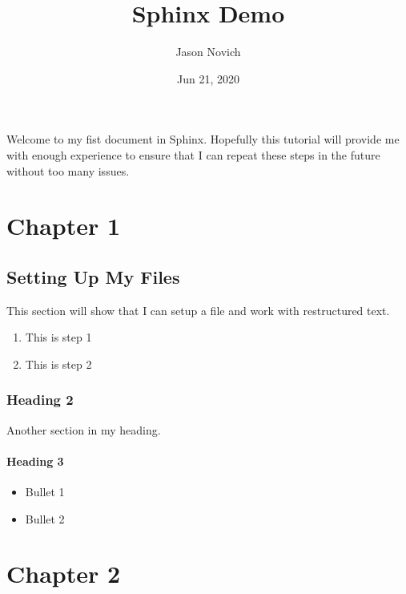 \documentclass[letterpaper,10pt,english]{sphinxmanual}
\title{Sphinx Demo}
\date{Jun 21, 2020}
\author{Jason Novich}
\begin{document}
\pagestyle{empty}
\sphinxmaketitle
\pagestyle{plain}
\sphinxtableofcontents
\pagestyle{normal}
\label{\detokenize{index::doc}}


Welcome to my fist document in Sphinx. Hopefully this tutorial will provide me with enough experience
to ensure that I can repeat these steps in the future without too many issues.


\chapter{Chapter 1}
\label{\detokenize{Chapter1:chapter-1}}\label{\detokenize{Chapter1:chapter1}}\label{\detokenize{Chapter1::doc}}

\section{Setting Up My Files}
\label{\detokenize{Chapter1:setting-up-my-files}}
This section will show that I can setup a file and work with restructured text.
\begin{enumerate}
%
\item {} 
This is step 1

\item {} 
This is step 2

\end{enumerate}


\subsection{Heading 2}
\label{\detokenize{Chapter1:heading-2}}
Another section in my heading.




\subsubsection{Heading 3}
\label{\detokenize{Chapter1:heading-3}}\begin{itemize}
\item {} 
Bullet 1

\item {} 
Bullet 2

\end{itemize}


\chapter{Chapter 2}
\label{\detokenize{Chapter2:chapter-2}}\label{\detokenize{Chapter2::doc}}
\end{document}
